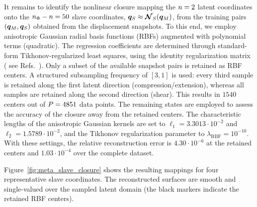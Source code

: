 \documentclass[preprint,10pt]{elsarticle}  %
\begin{document}
  It remains to identify the nonlinear closure mapping the
\(n=2\) latent coordinates onto the
\(n_{\Phi}-n=50\) slave coordinates,
\(\bm{q}_{S}\approx\boldsymbol{\mathcal{N}}_{S}(\bm{q}_M)\), from the training pairs
\((\bm{q}_M,\bm{q}_{S})\) obtained from the displacement snapshots. To this end, we employ anisotropic
Gaussian radial basis functions (RBFs) augmented with polynomial
terms (quadratic). The regression coefficients are determined through
standard-form Tikhonov-regularized least squares, using the identity
regularization matrix ( see
Refs.~\cite{poggio1990networks,wendland2005scattered}). Only a subset of the available snapshot pairs is retained as RBF
centers. A structured subsampling frequency of \([3,1]\) is used:
every third sample is retained along the first latent direction
(compression/extension), whereas all samples are retained along the
second direction (shear). This results in \(1540\) centers out of $P =4851$ data points. The
remaining states are employed to assess the accuracy of the closure away
from the retained centers. The characteristic lengths of the anisotropic Gaussian kernels are set to
\(\ell_1=3.3013\cdot10^{-2}\) and
\(\ell_2=1.5789\cdot10^{-2}\), and the Tikhonov regularization
parameter  to \(\lambda_{\mathrm{RBF}}=10^{-10}\). With these
settings, the relative reconstruction error is
\(4.30\cdot10^{-6}\) at the retained centers and
\(1.03\cdot10^{-4}\) over the complete dataset.

Figure~\ref{fig:meta_slave_closure} shows the resulting mappings for
four representative slave coordinates. The reconstructed surfaces are
smooth and single-valued over the sampled latent domain (the black markers indicate the retained RBF centers).
\end{document}
